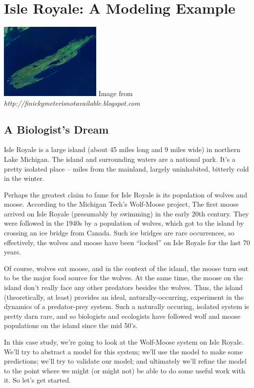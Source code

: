 

\chapter{Isle Royale: A Modeling Example}

\begin{marginfigure}
\includegraphics[width=5cm]{figs/IsleRoyale}
Image from {\em{http://finickymeterisnotavailable.blogspot.com}}
\end{marginfigure}


\section{A Biologist's Dream}
Isle Royale is a large island (about 45 miles long and 9 miles wide) in northern Lake Michigan.  The island and surrounding waters are a national park.  It's a pretty isolated place -- miles from the mainland, largely uninhabited, bitterly cold in the winter.

Perhaps the greatest claim to fame for Isle Royale is its population of wolves and moose.   According to the Michigan Tech's Wolf-Moose project, The first moose arrived on Isle Royale (presumably by swimming) in the early 20th century.  They were followed in the 1940s by a population of wolves, which got to the island by crossing an ice bridge from Canada.  Such ice bridges are rare occurrences, so effectively, the wolves and moose have been ``locked'' on Isle Royale for the last 70 years.

Of course, wolves eat moose, and in the context of the island, the moose turn out to be the major food source for the wolves.  At the same time, the moose on the island don't really face any other predators besides the wolves.  Thus, the island (theoretically, at least) provides an ideal, naturally-occurring, experiment in the dynamics of a predator-prey system.  Such a naturally occuring, isolated system is pretty darn rare, and so biologists and ecologists have followed wolf and moose populations on the island since the mid 50's.

In this case study, we're going to look at the Wolf-Moose system on Isle Royale.  We'll try to abstract a model for this system; we'll use the model to make some predictions; we'll try to validate our model; and ultimately we'll refine the model to the point where we might (or might not) be able to do some useful work with it.  So let's get started.


